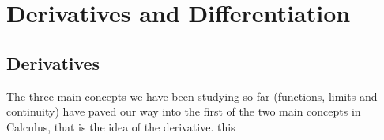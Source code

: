 \documentclass{report}
\begin{document}
    \tableofcontents

    \pagebreak
    \chapter{ Derivatives and Differentiation }

    \section{Derivatives}

    The three main concepts we have been studying so far (functions, limits and continuity) have paved our way into the first of the two main concepts in Calculus, that is the idea of the derivative. this
\end{document}
